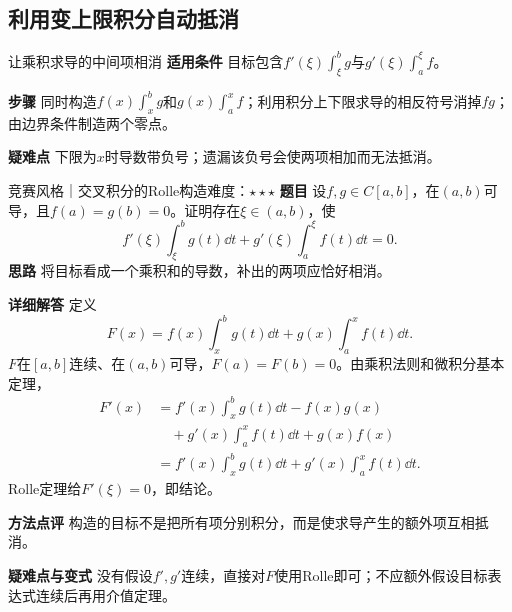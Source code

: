 \subsection{利用变上限积分自动抵消}
\begin{method}{让乘积求导的中间项相消}
\textbf{适用条件} 目标包含$f'(\xi)\int_\xi^bg$与$g'(\xi)\int_a^\xi f$。\par
\textbf{步骤} 同时构造$f(x)\int_x^bg$和$g(x)\int_a^xf$；利用积分上下限求导的相反符号消掉$fg$；由边界条件制造两个零点。\par
\textbf{疑难点} 下限为$x$时导数带负号；遗漏该负号会使两项相加而无法抵消。
\end{method}
\begin{example}{竞赛风格｜交叉积分的Rolle构造}{难度：$\star\star\star$}\label{cd:ex:cross-integral}
\textbf{题目} 设$f,g\in C[a,b]$，在$(a,b)$可导，且$f(a)=g(b)=0$。证明存在$\xi\in(a,b)$，使
\[
 f'(\xi)\int_\xi^bg(t)\dd t
 +g'(\xi)\int_a^\xi f(t)\dd t=0.
\]
\textbf{思路} 将目标看成一个乘积和的导数，补出的两项应恰好相消。\par
\textbf{详细解答} 定义
\[
 F(x)=f(x)\int_x^bg(t)\dd t
      +g(x)\int_a^xf(t)\dd t.
\]
$F$在$[a,b]$连续、在$(a,b)$可导，$F(a)=F(b)=0$。由乘积法则和微积分基本定理，
\begin{align*}
 F'(x)
 &=f'(x)\int_x^bg(t)\dd t-f(x)g(x)\\
 &\quad+g'(x)\int_a^xf(t)\dd t+g(x)f(x)\\
 &=f'(x)\int_x^bg(t)\dd t+g'(x)\int_a^xf(t)\dd t.
\end{align*}
Rolle定理给$F'(\xi)=0$，即结论。\par
\textbf{方法点评} 构造的目标不是把所有项分别积分，而是使求导产生的额外项互相抵消。\par
\textbf{疑难点与变式} 没有假设$f',g'$连续，直接对$F$使用Rolle即可；不应额外假设目标表达式连续后再用介值定理。
\end{example}

